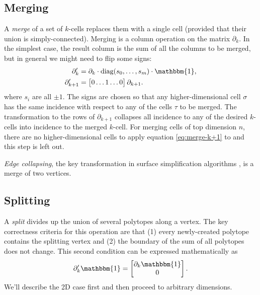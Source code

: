 \documentclass[twocolumn]{article}
\begin{document}
\subsection{Merging}

A \emph{merge} of a set of $k$-cells replaces them with a single cell (provided that their union is simply-connected).
Merging is a column operation on the matrix $\partial_k$.
In the simplest case, the result column is the sum of all the columns to be merged, but in general we might need to flip some signs:
\begin{align}
    \partial_k' & = \partial_k\cdot\text{diag}(s_0, \ldots, s_m)\cdot\mathbbm{1}, \\
    \partial_{k + 1}' & = \left[\begin{matrix} 0 \ldots 1 \ldots 0\end{matrix}\right]\partial_{k + 1}. \label{eq:merge-k+1}
\end{align}
where $s_i$ are all $\pm 1$.
The signs are chosen so that any higher-dimensional cell $\sigma$ has the same incidence with respect to any of the cells $\tau$ to be merged.
The transformation to the rows of $\partial_{k + 1}$ collapses all incidence to any of the desired $k$-cells into incidence to the merged $k$-cell.
For merging cells of top dimension $n$, there are no higher-dimensional cells to apply equation \eqref{eq:merge-k+1} to and this step is left out.

\emph{Edge collapsing}, the key transformation in surface simplification algorithms \cite{gueziec1995surface}, is a merge of two vertices.


\subsection{Splitting}

A \emph{split} divides up the union of several polytopes along a vertex.
The key correctness criteria for this operation are that (1) every newly-created polytope contains the splitting vertex and (2) the boundary of the sum of all polytopes does not change.
This second condition can be expressed mathematically as
\begin{equation}
    \partial_k'\mathbbm{1} = \left[\begin{matrix}\partial_k\mathbbm{1} \\ 0\end{matrix}\right].
    \label{eq:split-preserves-boundaries}
\end{equation}
We'll describe the 2D case first and then proceed to arbitrary dimensions.
\end{document}

